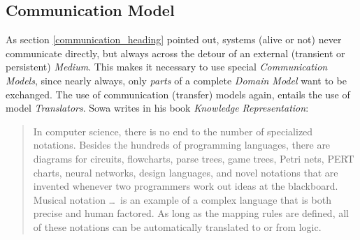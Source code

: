 %
%
%
%
%
%
%

\subsection{Communication Model}
\label{communication_model_heading}

As section \ref{communication_heading} pointed out, systems (alive or not)
never communicate directly, but always across the detour of an external
(transient or persistent) \emph{Medium}. This makes it necessary to use special
\emph{Communication Models}, since nearly always, only \emph{parts} of a
complete \emph{Domain Model} want to be exchanged. The use of communication
(transfer) models again, entails the use of model \emph{Translators}. Sowa
\cite{sowa} writes in his book \emph{Knowledge Representation}:

\begin{quote}
    In computer science, there is no end to the number of specialized notations.
    Besides the hundreds of programming languages, there are diagrams for circuits,
    flowcharts, parse trees, game trees, Petri nets, PERT charts, neural networks,
    design languages, and novel notations that are invented whenever two
    programmers work out ideas at the blackboard. Musical notation \ldots\
    is an example of a complex language that is both precise and human factored.
    As long as the mapping rules are defined, all of these notations can be
    automatically translated to or from logic.
\end{quote}

